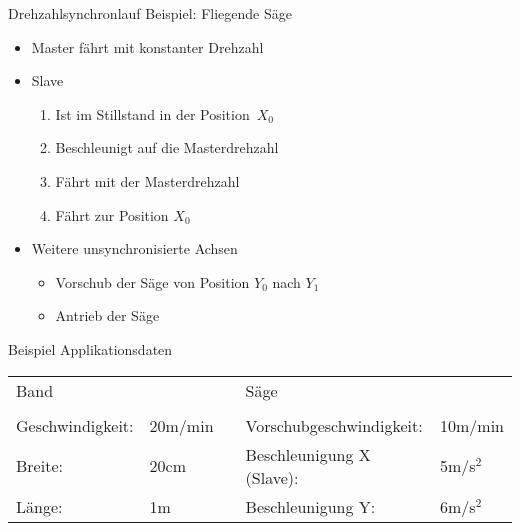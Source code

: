 \begin{frame}{Drehzahlsynchronlauf}
%
Beispiel: Fliegende Säge
%
\begin{itemize}
  \item Master fährt mit konstanter Drehzahl
  \item Slave 
  \begin{enumerate}
    \item Ist im Stillstand in der Position~$X_0$
    \item Beschleunigt auf die Masterdrehzahl
    \item Fährt mit der Masterdrehzahl
    \item Fährt zur Position $X_0$
  \end{enumerate}
  \item Weitere unsynchronisierte Achsen
  \begin{itemize}
    \item Vorschub der Säge von Position $Y_0$ nach $Y_1$
    \item Antrieb der Säge
  \end{itemize}
\end{itemize}
%
\begin{block}{Beispiel Applikationsdaten}
%
\begin{tabular}{llp{0.25cm}ll}
%
Band                &         &&Säge\\[0.25em]
\cline{1-2} \cline{4-5}
%
\\[-0.75em]

%
Geschwindigkeit:     &20m/min  &&Vorschubgeschwindigkeit:&10m/min\\
Breite:              &20cm     &&Beschleunigung X (Slave):&5m/s$^{2}$\\
Länge:               &1m       &&Beschleunigung Y:&6m/s$^{2}$
%
\end{tabular}
%
\end{block}
%
\end{frame}
%
%
%
